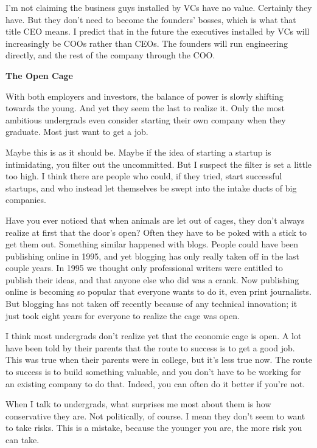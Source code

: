 \documentclass[12pt]{book}
\begin{document}
I'm not claiming the business guys installed by VCs have no value.
Certainly they have. But they don't need to become the founders' bosses,
which is what that title CEO means. I predict that in the future the
executives installed by VCs will increasingly be COOs rather than CEOs.
The founders will run engineering directly, and the rest of the company
through the COO.

\textbf{The Open Cage}

With both employers and investors, the balance of power is slowly
shifting towards the young. And yet they seem the last to realize it.
Only the most ambitious undergrads even consider starting their own
company when they graduate. Most just want to get a job.

Maybe this is as it should be. Maybe if the idea of starting a startup
is intimidating, you filter out the uncommitted. But I suspect the
filter is set a little too high. I think there are people who could, if
they tried, start successful startups, and who instead let themselves be
swept into the intake ducts of big companies.

Have you ever noticed that when animals are let out of cages, they don't
always realize at first that the door's open? Often they have to be
poked with a stick to get them out. Something similar happened with
blogs. People could have been publishing online in 1995, and yet
blogging has only really taken off in the last couple years. In 1995 we
thought only professional writers were entitled to publish their ideas,
and that anyone else who did was a crank. Now publishing online is
becoming so popular that everyone wants to do it, even print
journalists. But blogging has not taken off recently because of any
technical innovation; it just took eight years for everyone to realize
the cage was open.

I think most undergrads don't realize yet that the economic cage is
open. A lot have been told by their parents that the route to success is
to get a good job. This was true when their parents were in college, but
it's less true now. The route to success is to build something valuable,
and you don't have to be working for an existing company to do that.
Indeed, you can often do it better if you're not.

When I talk to undergrads, what surprises me most about them is how
conservative they are. Not politically, of course. I mean they don't
seem to want to take risks. This is a mistake, because the younger you
are, the more risk you can take.
\end{document}
